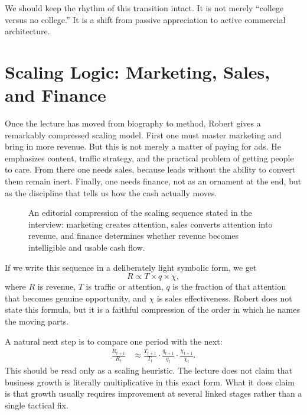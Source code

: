 We should keep the rhythm of this transition intact. It is not merely ``college versus no college.'' It is a shift from passive appreciation to active commercial architecture.

\section{Scaling Logic: Marketing, Sales, and Finance}

Once the lecture has moved from biography to method, Robert gives a remarkably compressed scaling model. First one must master marketing and bring in more revenue. But this is not merely a matter of paying for ads. He emphasizes content, traffic strategy, and the practical problem of getting people to care. From there one needs sales, because leads without the ability to convert them remain inert. Finally, one needs finance, not as an ornament at the end, but as the discipline that tells us how the cash actually moves.

\begin{figure}[h]
\centering
{}
\caption{An editorial compression of the scaling sequence stated in the interview: marketing creates attention, sales converts attention into revenue, and finance determines whether revenue becomes intelligible and usable cash flow.}
\end{figure}

If we write this sequence in a deliberately light symbolic form, we get
\begin{equation}
R \propto T \times q \times \chi,
\end{equation}
where \(R\) is revenue, \(T\) is traffic or attention, \(q\) is the fraction of that attention that becomes genuine opportunity, and \(\chi\) is sales effectiveness. Robert does not state this formula, but it is a faithful compression of the order in which he names the moving parts.

A natural next step is to compare one period with the next:
\begin{align}
\frac{R_{t+1}}{R_t}
   &\approx
   \frac{T_{t+1}}{T_t}
   \cdot
   \frac{q_{t+1}}{q_t}
   \cdot
   \frac{\chi_{t+1}}{\chi_t}.
\end{align}
This should be read only as a scaling heuristic. The lecture does not claim that business growth is literally multiplicative in this exact form. What it does claim is that growth usually requires improvement at several linked stages rather than a single tactical fix.

